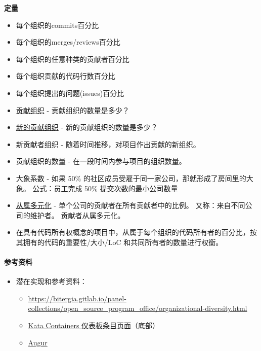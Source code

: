 \textbf{定量}

\begin{itemize}
\tightlist
\item
  每个组织的commits百分比
\item
  每个组织的merges/reviews百分比
\item
  每个组织的任意种类的贡献者百分比
\item
  每个组织贡献的代码行数百分比
\item
  每个组织提出的问题(issues)百分比
\item
  \href{https://github.com/chaoss/metrics/blob/master/activity-metrics/contributing-organizations.md}{贡献组织}
  - 贡献组织的数量是多少？
\item
  \href{https://github.com/chaoss/metrics/blob/master/activity-metrics/new-contributing-organizations.md}{新的贡献组织}
  - 新的贡献组织的数量是多少？
\item
  新贡献者组织 - 随着时间推移，对项目作出贡献的新组织。
\item
  贡献组织的数量 - 在一段时间内参与项目的组织数量。
\item
  大象系数 - 如果 50\%
  的社区成员受雇于同一家公司，那就形成了房间里的大象。 公式：员工完成
  50\% 提交次数的最小公司数量
\item
  \href{https://github.com/chaoss/metrics/blob/master/activity-metrics/contributor-diversity.md}{从属多元化}
  - 单个公司的贡献者在所有贡献者中的比例。 又称：来自不同公司的维护者。
  贡献者从属多元化。
\item
  在具有代码所有权概念的项目中，从属于每个组织的代码所有者的百分比，按其拥有的代码的重要性/大小/LoC
  和共同所有者的数量进行权衡。
\end{itemize}

\hypertarget{ux53c2ux8003ux8d44ux6599}{%
\paragraph{参考资料}\label{ux53c2ux8003ux8d44ux6599}}

\begin{itemize}
\tightlist
\item
  潜在实现和参考资料：

  \begin{itemize}
  \tightlist
  \item
    \href{https://bitergia.gitlab.io/panel-collections/open_source_program_office/organizational-diversity.html}{https://bitergia.gitlab.io/panel-collections/open\_source\_program\_office/organizational-diversity.html}
  \item
    \href{https://katacontainers.biterg.io}{Kata Containers
    仪表板条目页面}（底部）
  \item
    \href{https://github.com/chaoss/augur}{Augur}
  \end{itemize}
\end{itemize}
